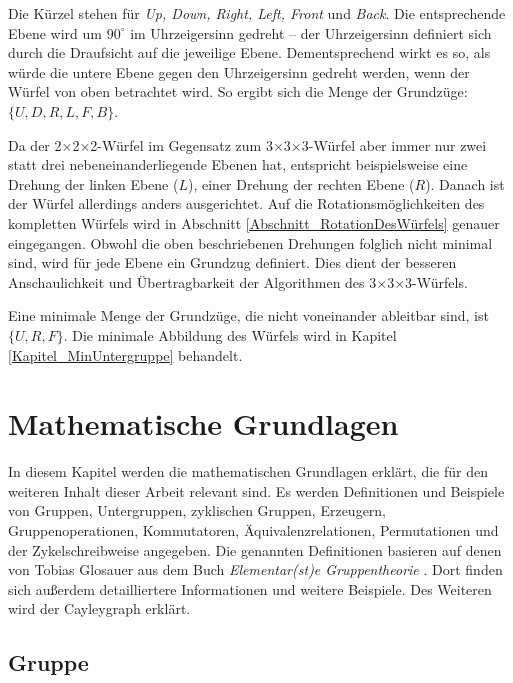 \documentclass[12pt,a4paper, usenames, dvipsnames]{article}
\theoremstyle{mystyle}
\theoremstyle{definition}
\newcommand{\Ttwo}{2$\times$2$\times$2-}
\newcommand{\Tthree}{3$\times$3$\times$3-}
\begin{document}
Die Kürzel stehen für \textit{Up, Down, Right, Left, Front} und \textit{Back}. 
Die entsprechende Ebene wird um $90^\circ$ im Uhrzeigersinn gedreht -- der Uhrzeigersinn definiert sich durch die Draufsicht auf die jeweilige Ebene.
Dementsprechend wirkt es so, als würde die untere Ebene gegen den Uhrzeigersinn gedreht werden, wenn der Würfel von oben betrachtet wird. So ergibt sich die Menge der Grundzüge: $\{U, D, R, L, F, B\}$.


Da der \Ttwo Würfel im Gegensatz zum \Tthree Würfel aber immer nur zwei statt drei nebeneinanderliegende Ebenen hat, entspricht beispielsweise eine Drehung der linken Ebene ($L$), einer Drehung der rechten Ebene ($R$). Danach ist der Würfel allerdings anders ausgerichtet. 
Auf die Rotationsmöglichkeiten des kompletten Würfels wird in Abschnitt \ref{Abschnitt_RotationDesWürfels} genauer eingegangen. 
Obwohl die oben beschriebenen Drehungen folglich nicht minimal sind, wird für jede Ebene ein Grundzug definiert. Dies dient der besseren Anschaulichkeit und Übertragbarkeit der Algorithmen des \Tthree Würfels.


Eine minimale Menge der Grundzüge, die nicht voneinander ableitbar sind, ist $\{U, R, F\}$. Die minimale Abbildung des Würfels wird in Kapitel \ref{Kapitel_MinUntergruppe} behandelt.



%
%
%
%
%
%
%
%
%
%
%
%
%
%
%
%
%


\newpage
\section{Mathematische Grundlagen}

\label{Kapitel_MathematischeGrundlagen}

In diesem Kapitel werden die mathematischen Grundlagen erklärt, die für den weiteren Inhalt dieser Arbeit relevant sind. Es werden Definitionen und Beispiele von Gruppen, Untergruppen, zyklischen Gruppen, Erzeugern, Gruppenoperationen, Kommutatoren, Äquivalenzrelationen, Permutationen und der Zykelschreibweise angegeben.
Die genannten Definitionen basieren auf denen von Tobias Glosauer aus dem Buch \textit{Elementar(st)e Gruppentheorie} \cite{Buch}. Dort finden sich außerdem detailliertere Informationen und weitere Beispiele.
Des Weiteren wird der Cayleygraph erklärt. 
%
%
%
%
%
%
\subsection{Gruppe}
\label{Abschnitt_Gruppe}
\end{document}
